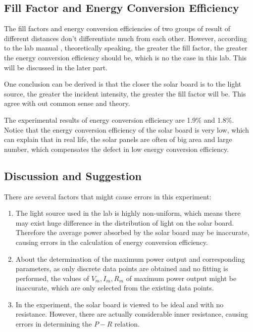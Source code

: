 \documentclass{article}
\begin{document}
{\subsection{Fill Factor and Energy Conversion Efficiency}
The fill factors and energy conversion efficiencies of two groups of result of different distances don't differentiate much from each other. However, according to the lab manual \cite{manual}, theoretically speaking, the greater the fill factor, the greater the energy conversion efficiency should be, which is no the case in this lab. This will be discussed in the later part.

One conclusion can be derived is that the closer the solar board is to the light source, the greater the incident intensity, the greater the fill factor will be. This agree with out common sense and theory.

The experimental results of energy conversion efficiency are 1.9\% and 1.8\%. Notice that the energy conversion efficiency of the solar board is very low, which can explain that in real life, the solar panels are often of big area and large number, which compensates the defect in low energy conversion efficiency.

\subsection{Discussion and Suggestion}
There are several factors that might cause errors in this experiment:

\begin{enumerate}
\item The light source used in the lab is highly non-uniform, which means there may exist huge difference in the distribution of light on the solar board. Therefore the average power absorbed by the solar board may be inaccurate, causing errors in the calculation of energy conversion efficiency.
\item About the determination of the maximum power output and corresponding parameters, as only discrete data points are obtained and no fitting is performed, the values of $V_m, I_m, R_m$ of maximum power output might be inaccurate, which are only selected from the existing data points.
\item In the experiment, the solar board is viewed to be ideal and with no resistance. However, there are actually considerable inner resistance, causing errors in determining the $P-R$ relation.
\end{enumerate}

}
\end{document}
